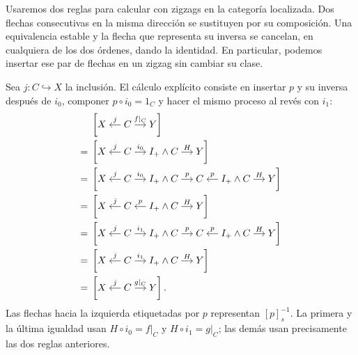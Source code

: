 \begin{nota}
Usaremos dos reglas para calcular con zigzags en la categoría localizada. Dos flechas consecutivas en la misma dirección se sustituyen por su composición. Una equivalencia estable y la flecha que representa su inversa se cancelan, en cualquiera de los dos órdenes, dando la identidad. En particular, podemos insertar ese par de flechas en un zigzag sin cambiar su clase.
\end{nota}

Sea $j\colon C\hookrightarrow X$ la inclusión. El cálculo explícito consiste en insertar $p$ y su inversa después de $i_0$, componer $p\circ i_0=1_C$ y hacer el mismo proceso al revés con $i_1$:
\[
\begin{aligned}
&\left[\begin{tikzcd}[cramped,column sep=small,ampersand replacement=\&]
X \& C \arrow[l,"j"'] \arrow[r,"f|_C"] \& Y
\end{tikzcd}\right]\\
={}&\left[\begin{tikzcd}[cramped,column sep=small,ampersand replacement=\&]
X \& C \arrow[l,"j"'] \arrow[r,"i_0"] \& I_+\wedge C \arrow[r,"H"] \& Y
\end{tikzcd}\right]\\
={}&\left[\begin{tikzcd}[cramped,column sep=small,ampersand replacement=\&]
X \& C \arrow[l,"j"'] \arrow[r,"i_0"] \& I_+\wedge C \arrow[r,"p"] \& C
\& I_+\wedge C \arrow[l,"p"'] \arrow[r,"H"] \& Y
\end{tikzcd}\right]\\
={}&\left[\begin{tikzcd}[cramped,column sep=small,ampersand replacement=\&]
X \& C \arrow[l,"j"'] \& I_+\wedge C \arrow[l,"p"'] \arrow[r,"H"] \& Y
\end{tikzcd}\right]\\
={}&\left[\begin{tikzcd}[cramped,column sep=small,ampersand replacement=\&]
X \& C \arrow[l,"j"'] \arrow[r,"i_1"] \& I_+\wedge C \arrow[r,"p"] \& C
\& I_+\wedge C \arrow[l,"p"'] \arrow[r,"H"] \& Y
\end{tikzcd}\right]\\
={}&\left[\begin{tikzcd}[cramped,column sep=small,ampersand replacement=\&]
X \& C \arrow[l,"j"'] \arrow[r,"i_1"] \& I_+\wedge C \arrow[r,"H"] \& Y
\end{tikzcd}\right]\\
={}&\left[\begin{tikzcd}[cramped,column sep=small,ampersand replacement=\&]
X \& C \arrow[l,"j"'] \arrow[r,"g|_C"] \& Y
\end{tikzcd}\right].
\end{aligned}
\]
Las flechas hacia la izquierda etiquetadas por $p$ representan $[p]_s^{-1}$. La primera y la última igualdad usan $H\circ i_0=f|_C$ y $H\circ i_1=g|_C$; las demás usan precisamente las dos reglas anteriores.

